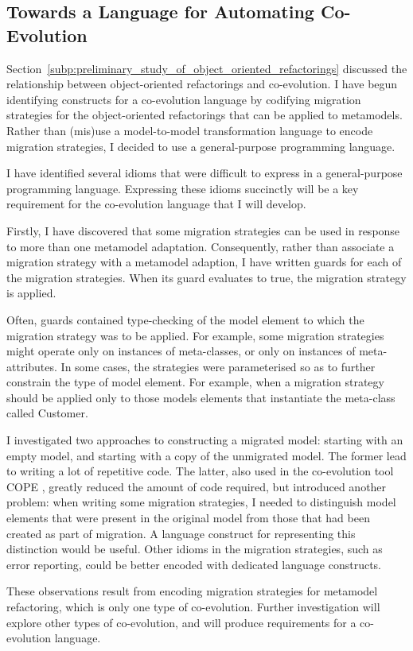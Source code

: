 \subsection{Towards a Language for Automating Co-Evolution}
\label{sub:development}
Section~\ref{subp:preliminary_study_of_object_oriented_refactorings} discussed the relationship between object-oriented refactorings and co-evolution. I have begun identifying constructs for a co-evolution language by codifying migration strategies for the object-oriented refactorings that can be applied to metamodels. Rather than (mis)use a model-to-model transformation language to encode migration strategies, I decided to use a general-purpose programming language.

I have identified several idioms that were difficult to express in a general-purpose programming language. Expressing these idioms succinctly will be a key requirement for the co-evolution language that I will develop.

Firstly, I have discovered that some migration strategies can be used in response to more than one metamodel adaptation. Consequently, rather than associate a migration strategy with a metamodel adaption, I have written guards for each of the migration strategies. When its guard evaluates to true, the migration strategy is applied.

Often, guards contained type-checking of the model element to which the migration strategy was to be applied. For example, some migration strategies might operate only on instances of meta-classes, or only on instances of meta-attributes. In some cases, the strategies were parameterised so as to further constrain the type of model element. For example, when a migration strategy should be applied only to those models elements that instantiate the meta-class called Customer.

I investigated two approaches to constructing a migrated model: starting with an empty model, and starting with a copy of the unmigrated model. The former lead to writing a lot of repetitive code. The latter, also used in the co-evolution tool COPE \cite{herrmannsdoerfer08cope}, greatly reduced the amount of code required, but introduced another problem: when writing some migration strategies, I needed to distinguish model elements that were present in the original model from those that had been created as part of migration. A language construct for representing this distinction would be useful. Other idioms in the migration strategies, such as error reporting, could be better encoded with dedicated language constructs.

These observations result from encoding migration strategies for metamodel refactoring, which is only one type of co-evolution. Further investigation will explore other types of co-evolution, and will produce requirements for a co-evolution language.
